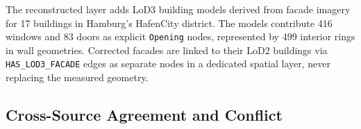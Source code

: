 \documentclass[sigconf,authordraft]{acmart}
\newcommand{\verify}[1]{\begingroup\setlength{\fboxsep}{1pt}\colorbox{red!25}{#1}\endgroup}
\begin{document}
The reconstructed layer adds LoD3 building models derived from facade imagery for 17 buildings in Hamburg's HafenCity district. The models contribute 416 windows and 83 doors as explicit \texttt{Opening} nodes, represented by 499 interior rings in wall geometries. %
Corrected facades are linked to their LoD2 buildings via \texttt{HAS\_LOD3\_FACADE} edges as separate nodes in a dedicated spatial layer, never replacing the measured geometry. 


\subsection{Cross-Source Agreement and Conflict}\label{subsec:conflict}
\end{document}
